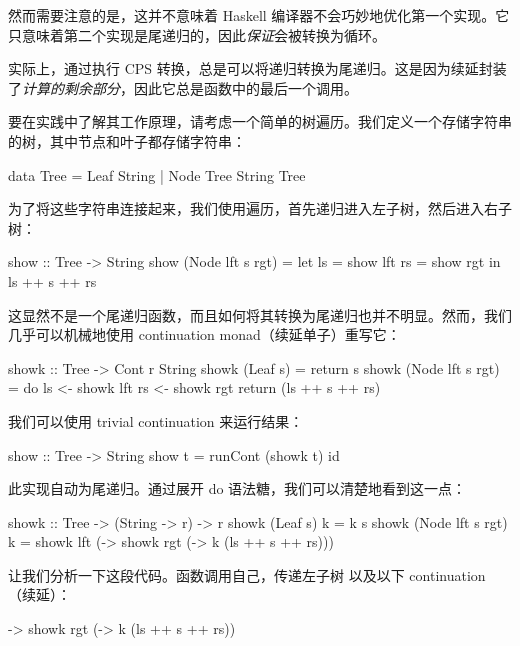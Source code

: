 \documentclass[DaoFP]{subfiles}
\begin{document}
    然而需要注意的是，这并不意味着 Haskell 编译器不会巧妙地优化第一个实现。它只意味着第二个实现是尾递归的，因此\emph{保证}会被转换为循环。

    实际上，通过执行 CPS 转换，总是可以将递归转换为尾递归。这是因为续延封装了\emph{计算的剩余部分}，因此它总是函数中的最后一个调用。

    要在实践中了解其工作原理，请考虑一个简单的树遍历。我们定义一个存储字符串的树，其中节点和叶子都存储字符串：

    \begin{haskell}
        data Tree = Leaf String
        | Node Tree String Tree
    \end{haskell}

    为了将这些字符串连接起来，我们使用遍历，首先递归进入左子树，然后进入右子树：

    \begin{haskell}
        show :: Tree -> String
        show (Node lft s rgt) =
        let ls = show lft
        rs = show rgt
        in ls ++ s ++ rs
    \end{haskell}

    这显然不是一个尾递归函数，而且如何将其转换为尾递归也并不明显。然而，我们几乎可以机械地使用 continuation monad（续延单子）重写它：

    \begin{haskell}
        showk :: Tree -> Cont r String
        showk (Leaf s) = return s
        showk (Node lft s rgt) = do
        ls <- showk lft
        rs <- showk rgt
        return (ls ++ s ++ rs)
    \end{haskell}

    我们可以使用 trivial continuation  来运行结果：

    \begin{haskell}
        show :: Tree -> String
        show t = runCont (showk t) id
    \end{haskell}

    此实现自动为尾递归。通过展开 do 语法糖，我们可以清楚地看到这一点：

    \begin{haskell}
        showk :: Tree -> (String -> r) -> r
        showk (Leaf s) k = k s
        showk (Node lft s rgt) k =
        showk lft (\ls ->
        showk rgt (\rs ->
        k (ls ++ s ++ rs)))
    \end{haskell}

    让我们分析一下这段代码。函数调用自己，传递左子树  以及以下 continuation（续延）：

    \begin{haskell}
        \ls ->
        showk rgt (\rs ->
        k (ls ++ s ++ rs))
    \end{haskell}
\end{document}
